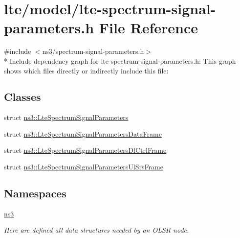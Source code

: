 \hypertarget{lte-spectrum-signal-parameters_8h}{}\section{lte/model/lte-\/spectrum-\/signal-\/parameters.h File Reference}
\label{lte-spectrum-signal-parameters_8h}
{\ttfamily \#include $<$ns3/spectrum-\/signal-\/parameters.\+h$>$}\\*
Include dependency graph for lte-\/spectrum-\/signal-\/parameters.h\+:
This graph shows which files directly or indirectly include this file\+:
\subsection*{Classes}
\begin{DoxyCompactItemize}
\item 
struct \hyperlink{structns3_1_1LteSpectrumSignalParameters}{ns3\+::\+Lte\+Spectrum\+Signal\+Parameters}
\item 
struct \hyperlink{structns3_1_1LteSpectrumSignalParametersDataFrame}{ns3\+::\+Lte\+Spectrum\+Signal\+Parameters\+Data\+Frame}
\item 
struct \hyperlink{structns3_1_1LteSpectrumSignalParametersDlCtrlFrame}{ns3\+::\+Lte\+Spectrum\+Signal\+Parameters\+Dl\+Ctrl\+Frame}
\item 
struct \hyperlink{structns3_1_1LteSpectrumSignalParametersUlSrsFrame}{ns3\+::\+Lte\+Spectrum\+Signal\+Parameters\+Ul\+Srs\+Frame}
\end{DoxyCompactItemize}
\subsection*{Namespaces}
\begin{DoxyCompactItemize}
\item 
 \hyperlink{namespacens3}{ns3}
\begin{DoxyCompactList}\small\item\em Here are defined all data structures needed by an O\+L\+SR node. \end{DoxyCompactList}\end{DoxyCompactItemize}
